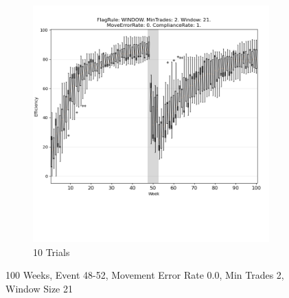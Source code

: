 \documentclass{article}%
\begin{document}
\begin{figure}[!htb]
\begin{subfigure}[b]{0.45\linewidth}
\includegraphics[clip,width=\linewidth,trim=0 4cm 0 0]{0054fr_WINDOW_mt_2_ws_21_er_0_cr_1_t10.png}%
\caption{10 Trials}%
\end{subfigure}%
\caption{100 Weeks, Event 48{-}52, Movement Error Rate 0.0, Min Trades 2, Window Size 21}%
\end{figure}

%
\end{document}
